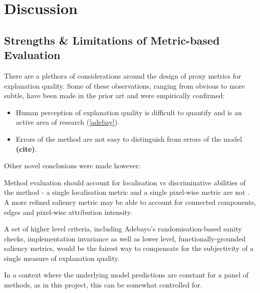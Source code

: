 \documentclass[main]{subfiles}
\begin{document}
\chapter{Discussion}

\section{Strengths \& Limitations of Metric-based Evaluation}

There are a plethora of considerations around the design of proxy metrics for explanation quality. Some of these observations, ranging from obvious to more subtle, have been made in the prior art and were empirically confirmed:
\begin{itemize}
\item Human perception of explanation quality is difficult to quantify and is an active area of research (\ref{adebay}).
\item Errors of the method are not easy to distinguish from errors of the model \textbf{(cite)}.

\end{itemize}


Other novel conclusions were made however:

Method evaluation should account for localisation vs discriminative abilities of the method - a single localisation metric and a single pixel-wise metric are not . A more refined saliency metric may be able to account for connected components, edges and pixel-wise attribution intensity.

A set of higher level criteria, including Adebayo's randomisation-based sanity checks, implementation invariance as well as lower level, functionally-grounded saliency metrics, would be the fairest way to compensate for the subjectivity  of a single measure of explanation quality.

In a context where the underlying model predictions are constant for a panel of methods, as in this project, this can be somewhat controlled for.







\end{document}

